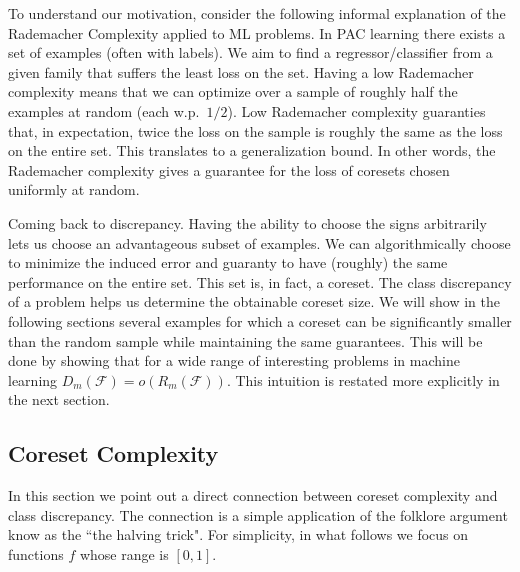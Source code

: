\documentclass[anon,12pt]{colt2019} %
\newcommand{\F}{\mathcal{F}}
\begin{document}
To understand our motivation, consider the following informal explanation of the Rademacher Complexity applied to ML problems. 
In PAC learning there exists a set of examples (often with labels).
We aim to find a regressor/classifier from a given family that suffers the least loss on the set. 
Having a low Rademacher complexity means that we can optimize over a sample of roughly half the examples at random (each w.p.\ $1/2$).
Low Rademacher complexity guaranties that, in expectation, twice the loss on the sample is roughly the same as the loss on the entire set.
This translates to a generalization bound. 
In other words, the Rademacher complexity gives a guarantee for the loss of coresets chosen uniformly at random.

Coming back to discrepancy. Having the ability to choose the signs arbitrarily lets us choose an advantageous subset of examples.
We can algorithmically choose to minimize the induced error and guaranty to have (roughly) the same performance on the entire set. 
This set is, in fact, a coreset. The class discrepancy of a problem helps us determine the obtainable coreset size. 
We will show in the following sections several examples for which a coreset can be significantly smaller than the random sample while maintaining the same guarantees. This will be done by showing that for a wide range of interesting problems in machine learning $D_m(\F) = o(R_m(\F))$.
This intuition is restated more explicitly in the next section.

\subsection{Coreset Complexity}
In this section we point out a direct connection between coreset complexity and class discrepancy.
The connection is a simple application of the folklore argument know as the ``the halving trick".
For simplicity, in what follows we focus on functions $f$ whose range is $[0,1]$.
\end{document}
